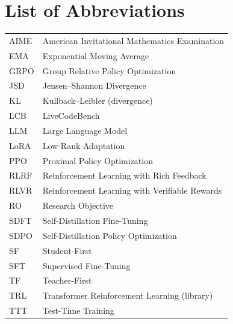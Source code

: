 \documentclass[12pt,a4paper]{report}
\begin{document}
\tableofcontents

\clearpage
{}
\listoffigures

\clearpage
{}
\listoftables

\clearpage
\chapter*{List of Abbreviations}
\begin{longtable}{@{}p{2.6cm}l@{}}
AIME & American Invitational Mathematics Examination \\
EMA  & Exponential Moving Average \\
GRPO & Group Relative Policy Optimization \\
JSD  & Jensen--Shannon Divergence \\
KL   & Kullback--Leibler (divergence) \\
LCB  & LiveCodeBench \\
LLM  & Large Language Model \\
LoRA & Low-Rank Adaptation \\
PPO  & Proximal Policy Optimization \\
RLRF & Reinforcement Learning with Rich Feedback \\
RLVR & Reinforcement Learning with Verifiable Rewards \\
RO   & Research Objective \\
SDFT & Self-Distillation Fine-Tuning \\
SDPO & Self-Distillation Policy Optimization \\
SF   & Student-First \\
SFT  & Supervised Fine-Tuning \\
TF   & Teacher-First \\
TRL  & Transformer Reinforcement Learning (library) \\
TTT  & Test-Time Training \\
\end{longtable}









\clearpage
{}
{}
\renewcommand{\bibname}{References}



\appendix

\end{document}
